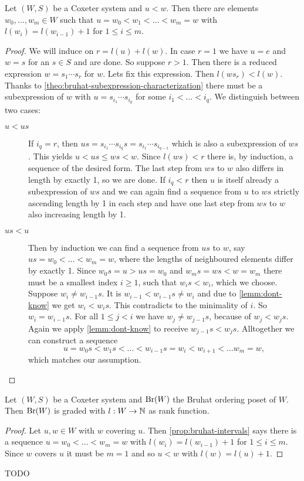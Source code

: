 \begin{prop}
	Let $(W,S)$ be a Coxeter system and $u < w$. Then there are elements $w_0,\ldots,w_m \in W$ such that $u = w_0 < w_1 < \ldots < w_m = w$ with $l(w_i) = l(w_{i-1}) + 1$ for $1 \leq i \leq m$.

	\begin{proof}
		We will induce on $r = l(u) + l(w)$. In case $r = 1$ we have $u = e$ and $w = s$ for an $s \in S$ and are done. So suppose $r > 1$. Then there is a reduced expression $w = s_1 \cdots s_r$ for $w$. Lets fix this expression. Then $l(w s_r) < l(w)$. Thanks to \ref{theo:bruhat-subexpression-characterization} there must be a subexpression of $w$ with $u = s_{i_1} \cdots s_{i_q}$ for some $i_1 < \ldots < i_q$. We distinguish between two cases:

		\begin{description}
			\item[$u < us$] If $i_q = r$, then $us = s_{i_1} \cdots s_{i_q} s = s_{i_1} \cdots s_{i_{q-1}}$ which is also a subexpression of $ws$. This yields $u < us \leq ws < w$. Since $l(ws) < r$ there is, by induction, a sequence of the desired form. The last step from $ws$ to $w$ also differs in length by exactly 1, so we are done. If $i_q < r$ then $u$ is itself already a subexpression of $ws$ and we can again find a sequence from $u$ to $ws$ strictly ascending length by 1 in each step and have one last step from $ws$ to $w$ also increasing length by 1.
			\item[$us < u$] Then by induction we can find a sequence from $us$ to $w$, say $us = w_0 < \ldots < w_m = w$, where the lengths of neighboured elements differ by exactly 1. Since $w_0 s = u > us = w_0$ and $w_m s = ws < w = w_m$ there must be a smallest index $i \geq 1$, such that $w_i s < w_i$, which we choose. Suppose $w_i \neq w_{i-1} s$. It is $w_{i-1} < w_{i-1}s \neq w_i$ and due to \ref{lemm:dont-know} we get $w_i < w_i s$. This contradicts to the minimality of $i$. So $w_i = w_{i-1} s$. For all $1 \leq j < i$ we have $w_j \neq w_{j-1} s$, because of $w_j < w_j s$. Again we apply \ref{lemm:dont-know} to receive $w_{j-1} s < w_j s$. Alltogether we can construct a sequence
			$$ u = w_0 s < w_1 s < \ldots < w_{i-1} s = w_i < w_{i+1} < \ldots w_m = w, $$
			which matches our assumption. \qedhere
		\end{description}
	\end{proof}
\end{prop}

\begin{theo}
	Let $(W,S)$ be a Coxeter system and $\operatorname{Br}(W)$ the Bruhat ordering poset of $W$. Then $\operatorname{Br}(W)$ is graded with $l:W \to \mathbb{N}$ as rank function.

	\begin{proof}
		Let $u,w \in W$ with $w$ covering $u$. Then \ref{prop:bruhat-intervals} says there is a sequence $u = w_0 < \ldots < w_m = w$ with $l(w_i) = l(w_{i-1}) + 1$ for $1 \leq i \leq m$. Since $w$ covers $u$ it must be $m = 1$ and so $u < w$ with $l(w) = l(u) + 1$.
	\end{proof}
\end{theo}

TODO